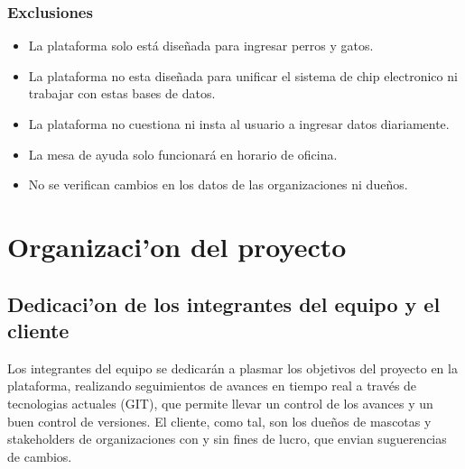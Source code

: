 \documentclass[letterpaper,openright,10pt,oneside]{report}
\begin{document}
			\subsection{Exclusiones}
			\begin{itemize}
	\item La plataforma solo está diseñada para ingresar perros y gatos. 
	\item La plataforma no esta diseñada para unificar el sistema de chip electronico ni trabajar con estas bases de datos.
	\item La plataforma no cuestiona ni insta al usuario a ingresar datos diariamente.
	\item La mesa de ayuda solo funcionará en horario de oficina.
	\item No se verifican cambios en los datos de las organizaciones ni dueños.

\end{itemize}
	\begin{comment}
		\chapter{Planificaci'on General del proyecto}
		\section{Estrategia de implantaci'on}
		\section{Plan General de proyecto}
		\section{Plan detallado del proyecto}
		\section{Entregables}
\end{comment}

	\chapter{Organizaci'on del proyecto}
		\section{Dedicaci'on de los integrantes del equipo y el cliente}
Los integrantes del equipo se dedicarán a plasmar los objetivos del proyecto en la plataforma, realizando seguimientos de avances en tiempo real a través de tecnologias actuales (GIT), que permite llevar un control de los avances y un buen control de versiones. El cliente, como tal, son los dueños de mascotas y stakeholders de organizaciones con y sin fines de lucro, que envian suguerencias de cambios.
\end{document}
